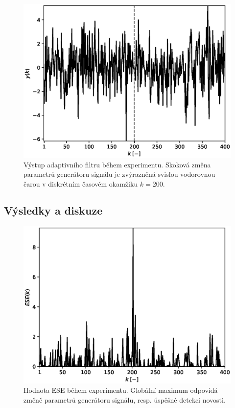 \begin{figure}[h!]
	\label{fig:par_output}
	\centering
	\includegraphics[scale=0.71]{IMG/appel_par/par_output.eps}
	\caption{Výstup adaptivního filtru během experimentu. Skoková změna parametrů generátoru signálu je zvýrazněná svislou vodorovnou čarou v diskrétním časovém okamžiku $k=200$.}
\end{figure}

\subsection{Výsledky a diskuze}


\begin{figure}[h!]
	\label{fig:par_ese}
	\centering
	\includegraphics[scale=0.71]{IMG/appel_par/par_ese.eps}
	\caption{Hodnota ESE během experimentu. Globální maximum odpovídá změně parametrů generátoru signálu, resp. úspěšné detekci novosti.}
\end{figure}

